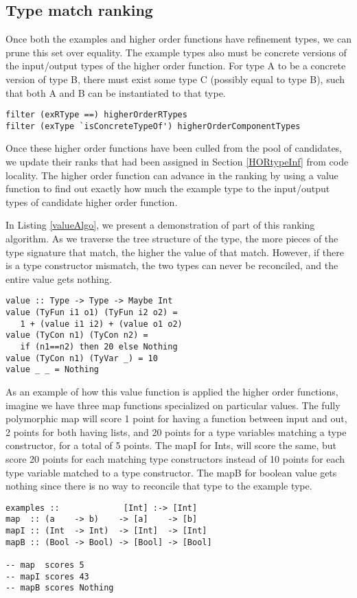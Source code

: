 \subsection{Type match ranking}\label{typeMatch}

Once both the examples and higher order functions have refinement types, we can prune this set over equality.
The example types also must be concrete versions of the input/output types of the higher order function.
For type A to be a concrete version of type B, there must exist some type C (possibly equal to type B), such that both A and B can be instantiated to that type.

\begin{lstlisting}[caption=Pruning based on types]
filter (exRType ==) higherOrderRTypes
filter (exType `isConcreteTypeOf') higherOrderComponentTypes
\end{lstlisting}

Once these higher order functions have been culled from the pool of candidates, we update their ranks that had been assigned in Section \ref{HORtypeInf} from code locality.
The higher order function can advance in the ranking by using a value function to find out exactly how much the example type  to the input/output types of candidate higher order function.

In Listing \ref{valueAlgo}, we present a demonstration of part of this ranking algorithm.
As we traverse the tree structure of the type, the more pieces of the type signature that match, the higher the value of that match. 
However, if there is a type constructor mismatch, the two types can never be reconciled, and the entire value gets nothing.

\begin{lstlisting}[caption=Type closeness ranking algorithm (sample),label=valueAlgo]
value :: Type -> Type -> Maybe Int
value (TyFun i1 o1) (TyFun i2 o2) =
   1 + (value i1 i2) + (value o1 o2)
value (TyCon n1) (TyCon n2) =
   if (n1==n2) then 20 else Nothing
value (TyCon n1) (TyVar _) = 10
value _ _ = Nothing
\end{lstlisting}

As an example of how this value function is applied the higher order functions, imagine we have three map functions specialized on particular values. 
The fully polymorphic map will score 1 point for having a function between input and out, 2 points for both having lists, and 20 points for a type variables matching a type constructor, for a total of 5 points. The mapI for Ints, will score the same, but score 20 points for each matching type constructors instead of 10 points for each type variable matched to a type constructor. The mapB for boolean value gets nothing since there is no way to reconcile that type to the example type.

\begin{lstlisting}[caption=Ranking higher order function,label=horank]
examples ::             [Int] :-> [Int]
map  :: (a    -> b)    -> [a]    -> [b]
mapI :: (Int  -> Int)  -> [Int]  -> [Int]
mapB :: (Bool -> Bool) -> [Bool] -> [Bool]

-- map  scores 5
-- mapI scores 43
-- mapB scores Nothing
\end{lstlisting}
